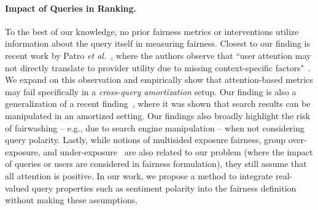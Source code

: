 \paragraph{Impact of Queries in Ranking.}
To the best of our knowledge, no prior fairness metrics or interventions utilize information about the query itself in measuring fairness. Closest to our finding is recent work by Patro \emph{et al.}~\cite{patro2022fair}, where the authors observe that ``user attention may not directly translate to provider utility due to missing context-specific factors"~\cite{patro2022fair}. We expand on this observation and empirically show that attention-based metrics may fail specifically in a \emph{cross-query amortization} setup. Our finding is also a generalization of a recent finding~\cite{de2023unfair}, where it was shown that search results can be manipulated in an amortized setting. Our findings also broadly highlight the risk of fairwashing -- e.g., due to search engine manipulation -- when not considering query polarity. Lastly, while notions of multisided exposure fairness, group over-exposure, and under-exposure~\cite{wu2022joint,burke2017multisided,wang2021user} are also related to our problem (where the impact of queries or users are considered in fairness formulation), they still assume that all attention is positive. In our work, we propose a method to integrate real-valued query properties such as sentiment polarity into the fairness definition without making these assumptions. 









